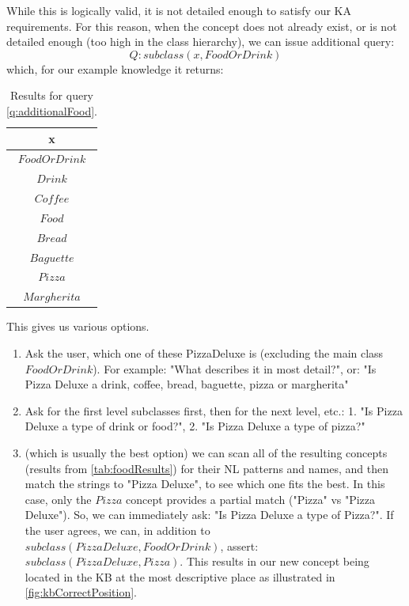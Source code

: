 While this is logically valid, it is not detailed enough to satisfy our KA 
requirements. For this reason, when the concept does not already exist, or is 
not detailed enough (too high in the class hierarchy), we can issue additional 
query:
\begin{equation}\label{q:additionalFood}
Q:subclass(x,FoodOrDrink)
\end{equation}
which, for our example knowledge it returns:
\begin{table}[H]
\centering
\caption{Results for query \ref{q:additionalFood}.}
\label{tab:foodResults}
\begin{tabular}{|c|}
	\hline
	\textbf{x} \\
    \hline
    $FoodOrDrink$ \\
    \hline
    $Drink$ \\
    \hline
    $Coffee$ \\
    \hline
    $Food$ \\
    \hline
    $Bread$ \\
    \hline
    $Baguette$ \\
    \hline
    $Pizza$ \\
    \hline
    $Margherita$ \\
    \hline
\end{tabular}
\end{table}
This gives us various options.
\begin{enumerate}
\item Ask the user, which one of these PizzaDeluxe is (excluding the main 
class $FoodOrDrink$). For example: "What describes it in most detail?", or: 
"Is Pizza Deluxe a drink, coffee, bread, baguette, pizza or margherita"
\item Ask for the first level subclasses first, then for the next level, 
etc.: 1. "Is Pizza Deluxe a type of drink or food?", 2. "Is Pizza Deluxe a 
type of pizza?"
\item (which is usually the best option) we can scan all of the resulting 
concepts (results from \autoref{tab:foodResults}) for their NL patterns and 
names, and then match the strings to "Pizza Deluxe", to see which one fits the 
best. In this case, only the $Pizza$ concept provides a partial match ("Pizza"
vs "Pizza Deluxe"). So, we can immediately ask: "Is Pizza Deluxe a type of 
Pizza?". If the user agrees, we can, in addition to 
$subclass(PizzaDeluxe,FoodOrDrink)$, assert: $subclass(PizzaDeluxe,Pizza)$. 
This results in our new concept being located in the KB at the most descriptive
place as illustrated in \autoref{fig:kbCorrectPosition}.
\end{enumerate}

